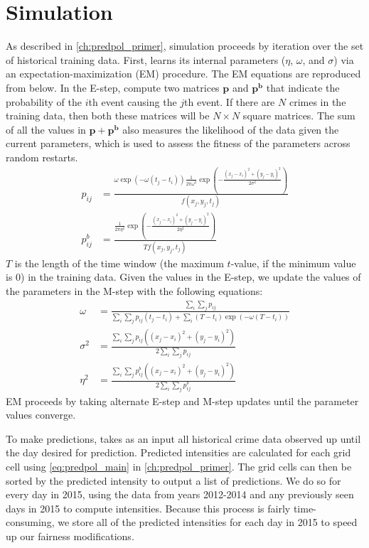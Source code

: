 \section{\pp Simulation}

As described in \autoref{ch:predpol_primer}, \pp simulation proceeds by iteration over the set of historical training data. First, \pp learns its internal parameters ($\eta$, $\omega$, and $\sigma$) via an expectation-maximization (EM) procedure. The EM equations are reproduced from \citet{mohler_marked_2014} below. In the E-step, compute two matrices $\mathbf{p}$ and $\mathbf{p^b}$ that indicate the probability of the $i$th event causing the $j$th event. If there are $N$ crimes in the training data, then both these matrices will be $N \times N$ square matrices. The sum of all the values in $\mathbf{p} + \mathbf{p^b}$ also measures the likelihood of the data given the current parameters, which is used to assess the fitness of the parameters across random restarts.
\begin{align}
    p_{ij} &= \frac{
        \omega \exp\left(-\omega(t_j - t_i)\right)
        \frac{1}{2 \pi \omega^2} \exp\left(
            -\frac{(x_j - x_i)^2 + (y_j - y_i)^2}{2\sigma^2}
        \right)
    }{f(x_j, y_j, t_j)}\\
    p^b_{ij} &= \frac{
        \frac{1}{2 \pi \eta^2} \exp\left(
            -\frac{(x_j - x_i)^2 + (y_j - y_i)^2}{2\eta^2}
        \right)
    }{T f(x_j, y_j, t_j)}
\end{align}
$T$ is the length of the time window (the maximum $t$-value, if the minimum value is 0) in the training data. Given the values in the E-step, we update the values of the parameters in the M-step with the following equations:
\begin{align}
    \omega &= \frac{\sum_i \sum_j p_{ij}}{
        \sum_i \sum_j p_{ij} (t_j - t_i) + 
        \sum_i (T - t_i) \exp(-\omega(T - t_i))
    }\\
    \sigma^2 &= \frac{
        \sum_i \sum_j p_{ij} \left(
            (x_j - x_i)^2 + (y_j - y_i)^2
        \right)
    }{2 \sum_i \sum_j p_{ij}}\\
    \eta^2 &= \frac{
        \sum_i \sum_j p^b_{ij} \left(
            (x_j - x_i)^2 + (y_j - y_i)^2
        \right)
    }{2 \sum_i \sum_j p^b_{ij}}
\end{align}
EM proceeds by taking alternate E-step and M-step updates until the parameter values converge.

To make predictions, \pp takes as an input all historical crime data observed up until the day desired for prediction. Predicted intensities are calculated for each grid cell using \autoref{eq:predpol_main} in \autoref{ch:predpol_primer}. The grid cells can then be sorted by the predicted intensity to output a list of predictions. We do so for every day in 2015, using the data from years 2012-2014 and any previously seen days in 2015 to compute intensities. Because this process is fairly time-consuming, we store all of the predicted intensities for each day in 2015 to speed up our fairness modifications.


